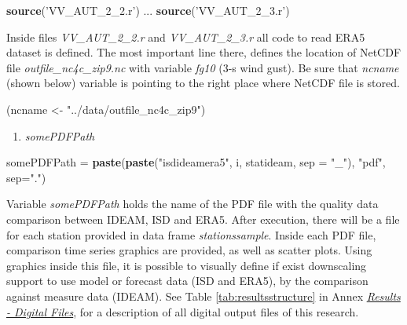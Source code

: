 \documentclass[12pt,twoside]{reedthesis}
\newenvironment{Shaded}{\begin{snugshade}}{\end{snugshade}}
\newcommand{\DataTypeTok}[1]{\textcolor[rgb]{0.13,0.29,0.53}{#1}}
\newcommand{\KeywordTok}[1]{\textcolor[rgb]{0.13,0.29,0.53}{\textbf{#1}}}
\newcommand{\NormalTok}[1]{#1}
\newcommand{\StringTok}[1]{\textcolor[rgb]{0.31,0.60,0.02}{#1}}
\providecommand{\tightlist}{%
  \setlength{\itemsep}{0pt}\setlength{\parskip}{0pt}}
\begin{document}
\vspace{0.4cm}
\begin{Shaded}
\begin{Highlighting}[]
      \KeywordTok{source}\NormalTok{(}\StringTok{'VV_AUT_2_2.r'}\NormalTok{)}
\NormalTok{      ...}
      \KeywordTok{source}\NormalTok{(}\StringTok{'VV_AUT_2_3.r'}\NormalTok{)}
\end{Highlighting}
\end{Shaded}
\normalsize

Inside files \emph{VV\_AUT\_2\_2.r} and \emph{VV\_AUT\_2\_3.r} all code to read ERA5 dataset is defined. The most important line there, defines the location of NetCDF file \emph{outfile\_nc4c\_zip9.nc} with variable \emph{fg10} (3-s wind gust). Be sure that \emph{ncname} (shown below) variable is pointing to the right place where NetCDF file is stored.

\scriptsize

\vspace{0.4cm}
\begin{Shaded}
\begin{Highlighting}[]
\NormalTok{      (ncname <-}\StringTok{ "../data/outfile_nc4c_zip9"}\NormalTok{)}
\end{Highlighting}
\end{Shaded}
\normalsize
\begin{enumerate}
\def\labelenumi{\arabic{enumi}.}
\setcounter{enumi}{4}
\tightlist
\item
  \emph{somePDFPath}
\end{enumerate}
\scriptsize

\vspace{0.4cm}
\begin{Shaded}
\begin{Highlighting}[]
\NormalTok{      somePDFPath =}\StringTok{ }\KeywordTok{paste}\NormalTok{(}\KeywordTok{paste}\NormalTok{(}\StringTok{"isdideamera5"}\NormalTok{, i, statideam, }\DataTypeTok{sep =} \StringTok{"_"}\NormalTok{), }\StringTok{"pdf"}\NormalTok{, }\DataTypeTok{sep=}\StringTok{"."}\NormalTok{)}
\end{Highlighting}
\end{Shaded}
\normalsize

Variable \emph{somePDFPath} holds the name of the PDF file with the quality data comparison between IDEAM, ISD and ERA5. After execution, there will be a file for each station provided in data frame \emph{stationssample}. Inside each PDF file, comparison time series graphics are provided, as well as scatter plots. Using graphics inside this file, it is possible to visually define if exist downscaling support to use model or forecast data (ISD and ERA5), by the comparison against measure data (IDEAM). See Table \ref{tab:resultsstructure} in Annex \emph{\protect\hyperlink{results}{Results - Digital Files}}, for a description of all digital output files of this research.
\end{document}
